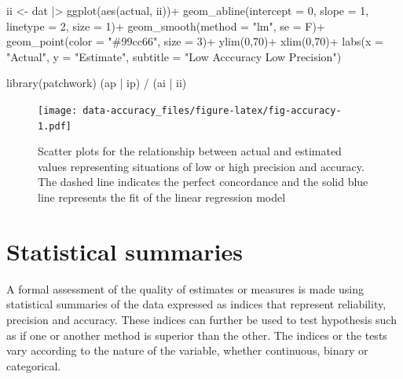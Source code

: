 \documentclass[
  letterpaper,
]{book}
\newenvironment{Shaded}{\begin{snugshade}}{\end{snugshade}}
\newcommand{\AttributeTok}[1]{\textcolor[rgb]{0.40,0.45,0.13}{#1}}
\newcommand{\DecValTok}[1]{\textcolor[rgb]{0.68,0.00,0.00}{#1}}
\newcommand{\FunctionTok}[1]{\textcolor[rgb]{0.28,0.35,0.67}{#1}}
\newcommand{\NormalTok}[1]{\textcolor[rgb]{0.00,0.23,0.31}{#1}}
\newcommand{\OtherTok}[1]{\textcolor[rgb]{0.00,0.23,0.31}{#1}}
\newcommand{\SpecialCharTok}[1]{\textcolor[rgb]{0.37,0.37,0.37}{#1}}
\newcommand{\StringTok}[1]{\textcolor[rgb]{0.13,0.47,0.30}{#1}}
\begin{document}
\begin{Shaded}
\begin{Highlighting}[]
\NormalTok{ii }\OtherTok{\textless{}{-}}\NormalTok{ dat }\SpecialCharTok{|\textgreater{}} 
  \FunctionTok{ggplot}\NormalTok{(}\FunctionTok{aes}\NormalTok{(actual, ii))}\SpecialCharTok{+}
  \FunctionTok{geom\_abline}\NormalTok{(}\AttributeTok{intercept =} \DecValTok{0}\NormalTok{, }\AttributeTok{slope =} \DecValTok{1}\NormalTok{, }
              \AttributeTok{linetype =} \DecValTok{2}\NormalTok{, }\AttributeTok{size =} \DecValTok{1}\NormalTok{)}\SpecialCharTok{+}
  \FunctionTok{geom\_smooth}\NormalTok{(}\AttributeTok{method =} \StringTok{"lm"}\NormalTok{, }\AttributeTok{se =}\NormalTok{ F)}\SpecialCharTok{+}
  \FunctionTok{geom\_point}\NormalTok{(}\AttributeTok{color =} \StringTok{"\#99cc66"}\NormalTok{, }\AttributeTok{size =} \DecValTok{3}\NormalTok{)}\SpecialCharTok{+}
  \FunctionTok{ylim}\NormalTok{(}\DecValTok{0}\NormalTok{,}\DecValTok{70}\NormalTok{)}\SpecialCharTok{+}
  \FunctionTok{xlim}\NormalTok{(}\DecValTok{0}\NormalTok{,}\DecValTok{70}\NormalTok{)}\SpecialCharTok{+}
  \FunctionTok{labs}\NormalTok{(}\AttributeTok{x =} \StringTok{"Actual"}\NormalTok{, }\AttributeTok{y =} \StringTok{"Estimate"}\NormalTok{,}
       \AttributeTok{subtitle =} \StringTok{"Low Acccuracy Low Precision"}\NormalTok{)}

\FunctionTok{library}\NormalTok{(patchwork)}
\NormalTok{(ap }\SpecialCharTok{|}\NormalTok{ ip) }\SpecialCharTok{/}\NormalTok{ (ai }\SpecialCharTok{|}\NormalTok{ ii)}
\end{Highlighting}
\end{Shaded}

\begin{figure}

\texttt{[image: data-accuracy\_files/figure-latex/fig-accuracy-1.pdf]} \hfill{}

\caption{\label{fig-accuracy}Scatter plots for the relationship between
actual and estimated values representing situations of low or high
precision and accuracy. The dashed line indicates the perfect
concordance and the solid blue line represents the fit of the linear
regression model}

\end{figure}

\hypertarget{statistical-summaries}{%
\section{Statistical summaries}\label{statistical-summaries}}

A formal assessment of the quality of estimates or measures is made
using statistical summaries of the data expressed as indices that
represent reliability, precision and accuracy. These indices can further
be used to test hypothesis such as if one or another method is superior
than the other. The indices or the tests vary according to the nature of
the variable, whether continuous, binary or categorical.
\end{document}

